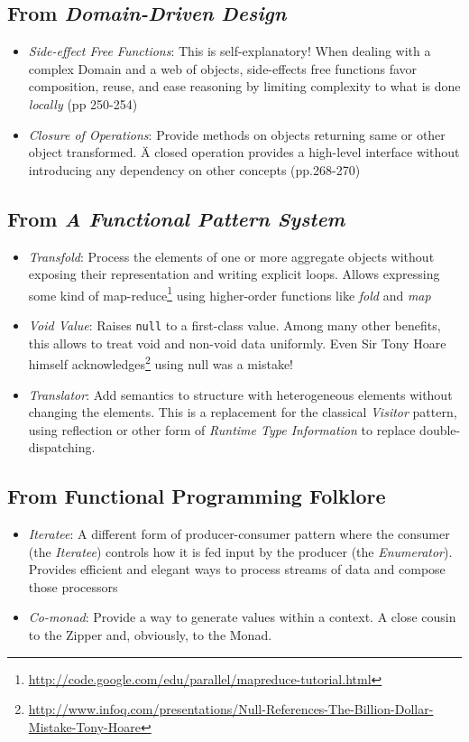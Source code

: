 \documentclass[11pt,]{article}
\renewcommand{\href}[2]{#2\footnote{\url{#1}}}
\begin{document}
\subsection{From \emph{Domain-Driven Design}}

\begin{itemize}
\item
  \emph{Side-effect Free Functions}: This is self-explanatory! When
  dealing with a complex Domain and a web of objects, side-effects free
  functions favor composition, reuse, and ease reasoning by limiting
  complexity to what is done \emph{locally} (pp 250-254)\\
\item
  \emph{Closure of Operations}: Provide methods on objects returning
  same or other object transformed. Ä closed operation provides a
  high-level interface without introducing any dependency on other
  concepts (pp.268-270)
\end{itemize}

\subsection{From \emph{A Functional Pattern System}}

\begin{itemize}
\item
  \emph{Transfold}: Process the elements of one or more aggregate
  objects without exposing their representation and writing explicit
  loops. Allows expressing some kind of
  \href{http://code.google.com/edu/parallel/mapreduce-tutorial.html}{map-reduce}
  using higher-order functions like \emph{fold} and \emph{map}
\item
  \emph{Void Value}: Raises \texttt{null} to a first-class value. Among
  many other benefits, this allows to treat void and non-void data
  uniformly. Even Sir Tony Hoare himself
  \href{http://www.infoq.com/presentations/Null-References-The-Billion-Dollar-Mistake-Tony-Hoare}{acknowledges}
  using null was a mistake!
\item
  \emph{Translator}: Add semantics to structure with heterogeneous
  elements without changing the elements. This is a replacement for the
  classical \emph{Visitor} pattern, using reflection or other form of
  \emph{Runtime Type Information} to replace double-dispatching.
\end{itemize}

\subsection{From Functional Programming Folklore}

\begin{itemize}
\item
  \emph{Iteratee}: A different form of producer-consumer pattern where
  the consumer (the \emph{Iteratee}) controls how it is fed input by the
  producer (the \emph{Enumerator}). Provides efficient and elegant ways
  to process streams of data and compose those processors
\item
  \emph{Co-monad}: Provide a way to generate values within a context. A
  close cousin to the Zipper and, obviously, to the Monad.
\end{itemize}
\end{document}
